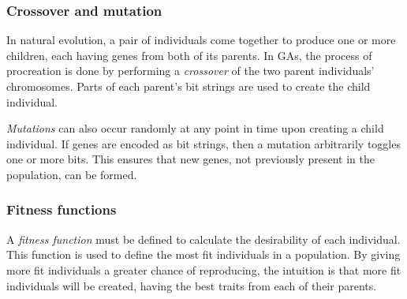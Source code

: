 
\subsubsection{Crossover and mutation}
In natural evolution, a pair of individuals come together to produce one or more children, each having genes from both of its parents. In GAs, the process of procreation is done by performing a \emph{crossover} of the two parent individuals' chromosomes. Parts of each parent's bit strings are used to create the child individual.

\emph{Mutations} can also occur randomly at any point in time upon creating a child individual. If genes are encoded as bit strings, then a mutation arbitrarily toggles one or more bits. This ensures that new genes, not previously present in the population, can be formed.

\subsubsection{Fitness functions}
A \emph{fitness function} must be defined to calculate the desirability of each individual. This function is used to define the most fit individuals in a population. By giving more fit individuals a greater chance of reproducing, the intuition is that more fit individuals will be created, having the best traits from each of their parents.

